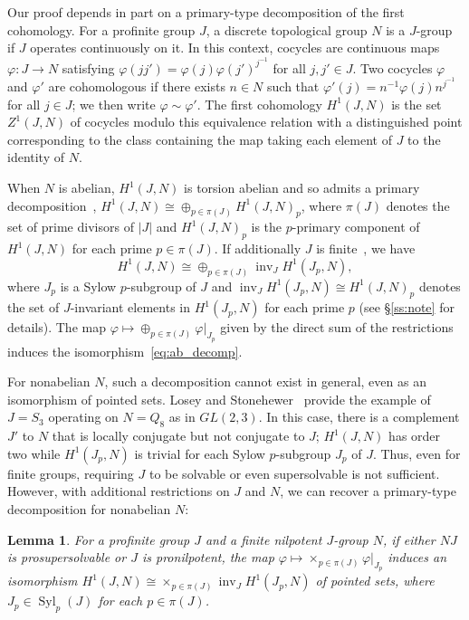 \documentclass{amsart}
\newtheorem{lemma}[theorem]{Lemma}
\theoremstyle{definition}
\theoremstyle{remark}
\numberwithin{equation}{section}
\newcommand{\iso}{\cong}
\providecommand{\abs}[1]{\ensuremath{\lvert#1\rvert}}
\renewcommand{\phi}{\varphi}
\DeclareMathOperator{\inv}{inv}
\DeclareMathOperator{\Syl}{Syl}
\begin{document}
Our proof depends in part on a primary-type decomposition of the first cohomology. For a profinite group $J$, a discrete topological group $N$ is a $J$-group if $J$ operates continuously on it. In this context, cocycles are continuous maps $\phi: J \to N$ satisfying
$\phi(jj') = \phi(j) \phi(j')^{j^{-1}}$ for all $j,j' \in J$. Two cocycles $\phi$ and $\phi'$ are cohomologous if there exists $n \in N$ such that
$\phi'(j) = n^{-1} \phi(j) n^{j^{-1}}$ for all $j\in J$; we then write $\phi\sim\phi'$. The first cohomology $H^1(J,N)$ is the
set $Z^1(J,N)$ of cocycles modulo this equivalence relation with a distinguished point corresponding to the class containing the map taking each
element of $J$ to the identity of $N$.

When $N$ is abelian, $H^1(J,N)$ is torsion abelian and so admits a primary decomposition~\cite[Cor. 6.7.6]{Rib10}, $H^1(J,N) \iso \textstyle \oplus_{p\in \pi(J)} H^1(J,N)_p$, where $\pi(J)$ denotes the set of prime divisors of $\abs{J}$ and $H^1(J,N)_p$ is the $p$-primary component of $H^1(J,N)$ for each prime $p\in \pi(J)$. If additionally $J$ is finite~\cite[Thm.~III.10.3]{Bro82}, we have
\begin{equation}
	\label{eq:ab_decomp}
	H^1(J,N) \iso \textstyle \oplus_{p\in \pi(J)} \inv_J H^1(J_p,N),
\end{equation}
where $J_p$ is a Sylow $p$-subgroup of $J$ and $\inv_J H^1(J_p,N) \iso H^1(J,N)_p$ denotes the set of $J$-invariant elements in $H^1(J_p,N)$ for each prime $p$ (see \S\ref{ss:note} for details). The map $\phi \mapsto \oplus_{p\in \pi(J)} \phi|_{J_p}$ given by the direct sum of the restrictions induces the isomorphism~\eqref{eq:ab_decomp}.

For nonabelian $N$, such a decomposition cannot exist in general, even as an isomorphism of pointed sets. Losey and Stonehewer~\cite[Sec.~3]{Los79} provide the example of $J=S_3$ operating on $N=Q_8$ as in $GL(2,3)$. In this case, there is a complement $J'$ to $N$ that is locally conjugate but not conjugate to $J$; $H^1(J,N)$ has order two while $H^1(J_p,N)$ is trivial for each Sylow $p$-subgroup $J_p$ of $J$. Thus, even for finite groups, requiring $J$ to be solvable or even supersolvable is not sufficient. However, with additional restrictions on $J$ and $N$, we can recover a primary-type decomposition for nonabelian $N$:

\begin{lemma}
	\label{lem:loc_conj}
	For a profinite group $J$ and a finite nilpotent $J$-group $N$, if either $NJ$ is prosupersolvable or $J$ is pronilpotent, the map $\phi \mapsto \times_{p\in\pi(J)} \phi|_{J_p}$ induces an isomorphism $H^1(J,N) \iso \times_{p \in \pi(J)} \inv_J H^1(J_p, N)$ of pointed sets, where  $J_p \in \Syl_p(J)$ for each $p \in \pi(J)$.
\end{lemma}
\end{document}
